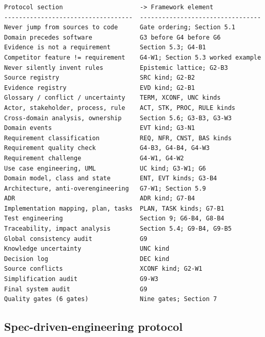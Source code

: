 \documentclass[11pt,a4paper]{article}
\begin{document}
\begin{Verbatim}[fontsize=\footnotesize,breaklines=true,breakanywhere=true,breakautoindent=false,samepage=false]
Protocol section                     -> Framework element
-----------------------------------  ---------------------------------
Never jump from sources to code      Gate ordering; Section 5.1
Domain precedes software             G3 before G4 before G6
Evidence is not a requirement        Section 5.3; G4-B1
Competitor feature != requirement    G4-W1; Section 5.3 worked example
Never silently invent rules          Epistemic lattice; G2-B3
Source registry                      SRC kind; G2-B2
Evidence registry                    EVD kind; G2-B1
Glossary / conflict / uncertainty    TERM, XCONF, UNC kinds
Actor, stakeholder, process, rule    ACT, STK, PROC, RULE kinds
Cross-domain analysis, ownership     Section 5.6; G3-B3, G3-W3
Domain events                        EVT kind; G3-N1
Requirement classification           REQ, NFR, CNST, BAS kinds
Requirement quality check            G4-B3, G4-B4, G4-W3
Requirement challenge                G4-W1, G4-W2
Use case engineering, UML            UC kind; G3-W1; G6
Domain model, class and state        ENT, EVT kinds; G3-B4
Architecture, anti-overengineering   G7-W1; Section 5.9
ADR                                  ADR kind; G7-B4
Implementation mapping, plan, tasks  PLAN, TASK kinds; G7-B1
Test engineering                     Section 9; G6-B4, G8-B4
Traceability, impact analysis        Section 5.4; G9-B4, G9-B5
Global consistency audit             G9
Knowledge uncertainty                UNC kind
Decision log                         DEC kind
Source conflicts                     XCONF kind; G2-W1
Simplification audit                 G9-W3
Final system audit                   G9
Quality gates (6 gates)              Nine gates; Section 7
\end{Verbatim}

\subsection{Spec-driven-engineering protocol}
\end{document}
